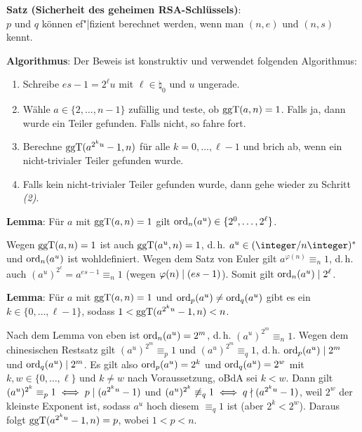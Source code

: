 \textbf{Satz (Sicherheit des geheimen RSA-Schlüssels)}:\\
$p$ und $q$ können ef"|fizient berechnet werden, wenn man $(n, e)$ und $(n, s)$ kennt.

\linie

\textbf{Algorithmus}:
Der Beweis ist konstruktiv und verwendet folgenden Algorithmus:
\begin{enumerate}
    \item
    Schreibe $es - 1 = 2^\ell u$ mit $\ell \in \natural_0$ und $u$ ungerade.
    
    \item
    Wähle $a \in \{2, \dotsc, n - 1\}$ zufällig und teste, ob $\operatorname{ggT}(a, n) = 1$.
    Falls ja, dann wurde ein Teiler gefunden.
    Falls nicht, so fahre fort.
    
    \item
    Berechne $\operatorname{ggT}(a^{2^k u} - 1, n)$ für alle $k = 0, \dotsc, \ell - 1$ und brich ab,
    wenn ein nicht-trivialer Teiler gefunden wurde.
    
    \item
    Falls kein nicht-trivialer Teiler gefunden wurde, dann gehe wieder zu Schritt \emph{(2)}.
\end{enumerate}

\linie

\textbf{Lemma}:
Für $a$ mit $\operatorname{ggT}(a, n) = 1$ gilt $\operatorname{ord}_n(a^u) \in \{2^0, \dotsc, 2^\ell\}$.

\begin{Beweis}
    Wegen $\operatorname{ggT}(a, n) = 1$ ist auch $\operatorname{ggT}(a^u, n) = 1$, d.\,h. $a^u \in (\ZnZ)^\ast$ und
    $\operatorname{ord}_n(a^u)$ ist wohldefiniert.
    Wegen dem Satz von Euler gilt $a^{\varphi(n)} \equiv_n 1$, d.\,h. auch
    $(a^u)^{2^\ell} = a^{es-1} \equiv_n 1$ (wegen $\varphi(n) \mid (es - 1)$).
    Somit gilt $\operatorname{ord}_n(a^u) \mid 2^\ell$.
\end{Beweis}

\textbf{Lemma}:
Für $a$ mit $\operatorname{ggT}(a, n) = 1$ und $\operatorname{ord}_p(a^u) \not= \operatorname{ord}_q(a^u)$ gibt es ein
$k \in \{0, \dotsc, \ell - 1\}$, sodass $1 < \operatorname{ggT}(a^{2^k u} - 1, n) < n$.

\begin{Beweis}
    Nach dem Lemma von eben ist $\operatorname{ord}_n(a^u) = 2^m$, d.\,h. $(a^u)^{2^m} \equiv_n 1$.
    Wegen dem chinesischen Restsatz gilt $(a^u)^{2^m} \equiv_p 1$ und
    $(a^u)^{2^m} \equiv_q 1$, d.\,h. $\operatorname{ord}_p(a^u) \mid 2^m$ und $\operatorname{ord}_q(a^u) \mid 2^m$.
    Es gilt also $\operatorname{ord}_p(a^u) = 2^k$ und $\operatorname{ord}_q(a^u) = 2^w$ mit $k, w \in \{0, \dotsc, \ell\}$
    und $k \not= w$ nach Voraussetzung, oBdA sei $k < w$.
    Dann gilt $(a^u)^{2^k} \equiv_p 1 \iff p \mid (a^{2^k u} - 1)$ und
    $(a^u)^{2^k} \not\equiv_q 1 \iff q \nmid (a^{2^k u} - 1)$,
    weil $2^w$ der kleinste Exponent ist, sodass $a^u$ hoch diesem $\equiv_q 1$ ist
    (aber $2^k < 2^w$).
    Daraus folgt $\operatorname{ggT}(a^{2^k u} - 1, n) = p$, wobei $1 < p < n$.
\end{Beweis}

